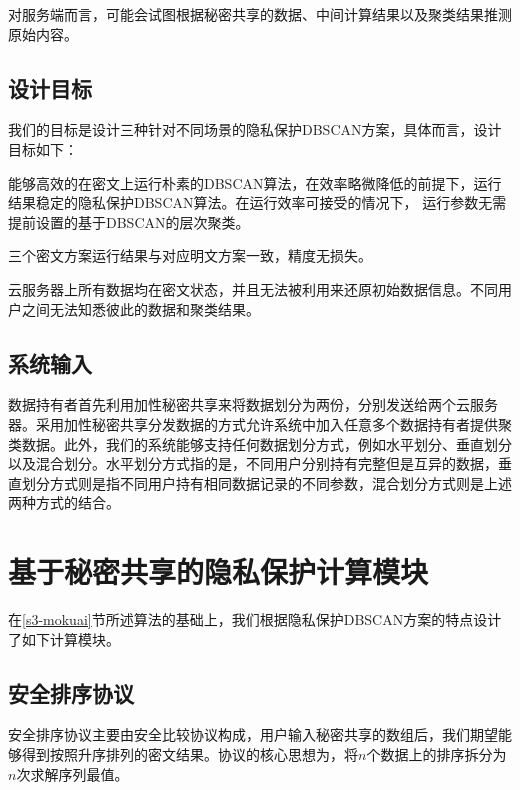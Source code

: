 对服务端而言，可能会试图根据秘密共享的数据、中间计算结果以及聚类结果推测原始内容。
\subsection{设计目标}
我们的目标是设计三种针对不同场景的隐私保护DBSCAN方案，具体而言，设计目标如下：

\begin{compactitem}
	\item 能够高效的在密文上运行朴素的DBSCAN算法，在效率略微降低的前提下，运行结果稳定的隐私保护DBSCAN算法。在运行效率可接受的情况下， 运行参数无需提前设置的基于DBSCAN的层次聚类。
	\item 三个密文方案运行结果与对应明文方案一致，精度无损失。
	\item 云服务器上所有数据均在密文状态，并且无法被利用来还原初始数据信息。不同用户之间无法知悉彼此的数据和聚类结果。
\end{compactitem}
\subsection{系统输入}
数据持有者首先利用加性秘密共享来将数据划分为两份，分别发送给两个云服务器。采用加性秘密共享分发数据的方式允许系统中加入任意多个数据持有者提供聚类数据。此外，我们的系统能够支持任何数据划分方式，例如水平划分、垂直划分以及混合划分。水平划分方式指的是，不同用户分别持有完整但是互异的数据\cite{gheid2016efficient}，垂直划分方式则是指不同用户持有相同数据记录的不同参数\cite{doganay2008distributed}，混合划分方式则是上述两种方式的结合\cite{yu2010multi}。
\section{基于秘密共享的隐私保护计算模块}
\label{s4-subpro}
在\ref{s3-mokuai}节所述算法的基础上，我们根据隐私保护DBSCAN方案的特点设计了如下计算模块。
\subsection{安全排序协议}
安全排序协议主要由安全比较协议构成，用户输入秘密共享的数组后，我们期望能够得到按照升序排列的密文结果。协议的核心思想为，将$ n $个数据上的排序拆分为$ n $次求解序列最值。

